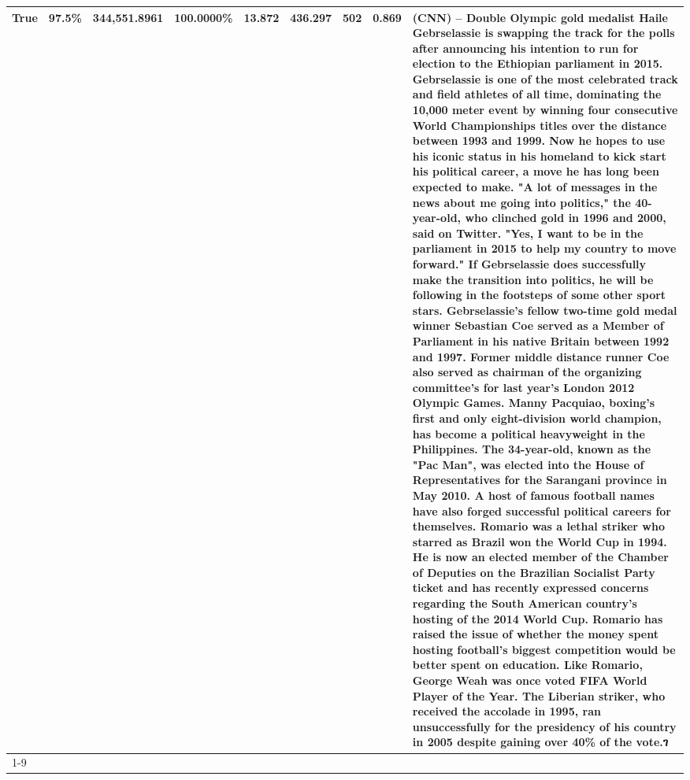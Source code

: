 \begin{table}[H]
{\begin{tabular}{lllrlllll}
True & 97.5\% & 344,551.8961 & \bfseries \color{red} 100.0000\% & 13.872 & 436.297 & 502 & 0.869 & (CNN) -- Double Olympic gold medalist Haile Gebrselassie is swapping the track for the polls after announcing his intention to run for election to the Ethiopian parliament in 2015. Gebrselassie is one of the most celebrated track and field athletes of all time, dominating the 10,000 meter event by winning four consecutive World Championships titles over the distance between 1993 and 1999. Now he hopes to use his iconic status in his homeland to kick start his political career, a move he has long been expected to make. "A lot of messages in the news about me going into politics," the 40-year-old, who clinched gold in 1996 and 2000, said on Twitter. "Yes, I want to be in the parliament in 2015 to help my country to move forward." If Gebrselassie does successfully make the transition into politics, he will be following in the footsteps of some other sport stars. Gebrselassie's fellow two-time gold medal winner Sebastian Coe served as a Member of Parliament in his native Britain between 1992 and 1997. Former middle distance runner Coe also served as chairman of the organizing committee's for last year's London 2012 Olympic Games. Manny Pacquiao, boxing's first and only eight-division world champion, has become a political heavyweight in the Philippines. The 34-year-old, known as the "Pac Man", was elected into the House of Representatives for the Sarangani province in May 2010. A host of famous football names have also forged successful political careers for themselves. Romario was a lethal striker who starred as Brazil won the World Cup in 1994. He is now an elected member of the Chamber of Deputies on the Brazilian Socialist Party ticket and has recently expressed concerns regarding the South American country's hosting of the 2014 World Cup. Romario has raised the issue of whether the money spent hosting football's biggest competition would be better spent on education. Like Romario, George Weah was once voted FIFA World Player of the Year. The Liberian striker, who received the accolade in 1995, ran unsuccessfully for the presidency of his country in 2005 despite gaining over 40\% of the vote.ገ \\
\cline{1-9}

\end{tabular}}
\end{table}

